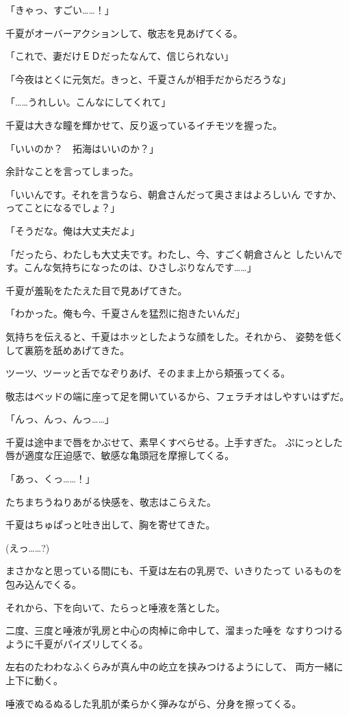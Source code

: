 ﻿\documentclass[
    book,tate,
    line_length=30zw,
    jafontsize=12pt,
    paper=b5j,
    landscape,
    ]{jlreq}
\begin{document}
「きゃっ、すごい……！」

千夏がオーバーアクションして、敬志を見あげてくる。

「これで、妻だけＥＤだったなんて、信じられない」

「今夜はとくに元気だ。きっと、千夏さんが相手だからだろうな」

「……うれしい。こんなにしてくれて」

千夏は大きな瞳を輝かせて、反り返っているイチモツを握った。

「いいのか？　拓海はいいのか？」

余計なことを言ってしまった。

「いいんです。それを言うなら、朝倉さんだって奥さまはよろしいん
ですか、ってことになるでしょ？」

「そうだな。俺は大丈夫だよ」

「だったら、わたしも大丈夫です。わたし、今、すごく朝倉さんと
したいんです。こんな気持ちになったのは、ひさしぶりなんです……」

千夏が羞恥をたたえた目で見あげてきた。

「わかった。俺も今、千夏さんを猛烈に抱きたいんだ」

気持ちを伝えると、千夏はホッとしたような顔をした。それから、
姿勢を低くして裏筋を舐めあげてきた。

ツーツ、ツーッと舌でなぞりあげ、そのまま上から頬張ってくる。

敬志はベッドの端に座って足を開いているから、フェラチオはしやすいはずだ。

「んっ、んっ、んっ……」

千夏は途中まで唇をかぶせて、素早くすべらせる。上手すぎた。
ぷにっとした唇が適度な圧迫感で、敏感な亀頭冠を摩擦してくる。

「あっ、くっ……！」

たちまちうねりあがる快感を、敬志はこらえた。

千夏はちゅぱっと吐き出して、胸を寄せてきた。

(えっ……?)

まさかなと思っている間にも、千夏は左右の乳房で、いきりたって
いるものを包み込んでくる。

それから、下を向いて、たらっと唾液を落とした。

二度、三度と唾液が乳房と中心の肉棹に命中して、溜まった唾を
なすりつけるように千夏がパイズリしてくる。

左右のたわわなふくらみが真ん中の屹立を挟みつけるようにして、
両方一緒に上下に動く。

唾液でぬるぬるした乳肌が柔らかく弾みながら、分身を擦ってくる。
\end{document}
